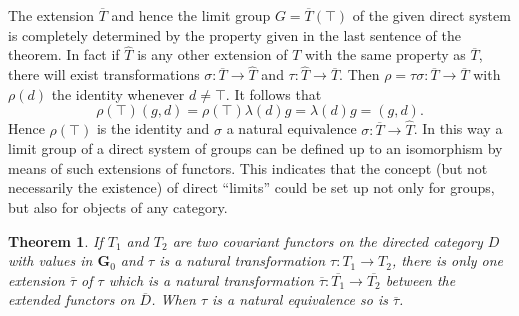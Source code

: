 \documentclass[11pt,a4paper]{report}
\newtheorem{theorem}{Theorem}
\begin{document}
The extension $\overline{T}$ and hence the limit group $G=\overline{T}(\top)$ of the given direct system is completely determined by
the property given in the last sentence of the theorem. In fact if $\hat{T}$ is any other extension of $T$ with the same
property as $\overline{T}$, there will exist transformations $\sigma:\overline{T}\rightarrow\hat{T}$ and
$\tau:\hat{T}\rightarrow\overline{T}$. Then $\rho=\tau\sigma:\overline{T}\rightarrow\overline{T}$ with $\rho(d)$
the identity whenever $d\ne\top$. It follows that
\begin{equation*}
	\rho(\top)(g,d)=\rho(\top)\lambda(d) g =\lambda(d) g = (g,d).
\end{equation*}
Hence $\rho(\top)$ is the identity and $\sigma$ a natural equivalence $\sigma:\overline{T}\rightarrow\hat{T}$. In this way a limit
group of a direct system of groups can be defined up to an isomorphism by means of such extensions of functors. This indicates that
the concept (but not necessarily the existence) of direct ``limits'' could be set up not only for groups, but also for objects of
any category.
\begin{theorem}\label{thm:dir-nat}
	If $T_1$ and $T_2$ are two covariant functors on the directed category $D$ with values in $\mathbf{G}_0$ and $\tau$ is a 
	natural transformation $\tau:T_1\rightarrow T_2$, there is only one extension $\overline{\tau}$ of $\tau$ which is a 
	natural transformation $\overline{\tau}:\overline{T_1}\rightarrow\overline{T_2}$ between the extended functors on 
	$\overline{D}$. When $\tau$ is a natural equivalence so is $\overline{\tau}$.
\end{theorem}
\end{document}
